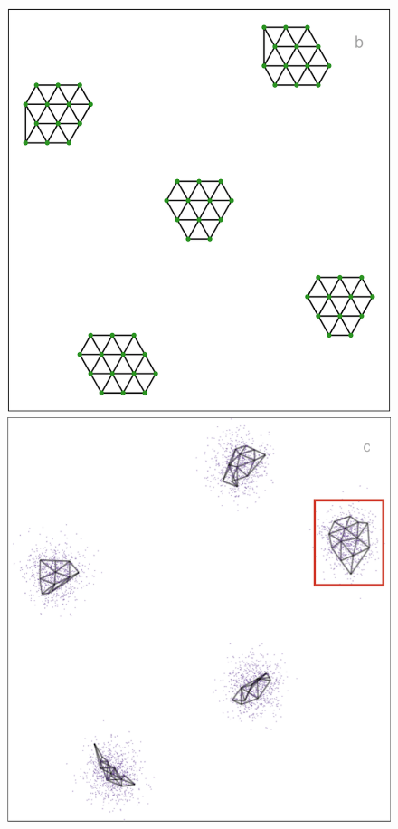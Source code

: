 \documentclass[
  12pt]{article}
\begin{document}
\begin{figure}[H]
\begin{minipage}{0.33\linewidth}
\includegraphics{figures/five_gau_clusters/2d_model_pacmap.png}\end{minipage}%
%
\begin{minipage}{0.33\linewidth}
\includegraphics{figures/five_gau_clusters/sc_pacmap_2.png}\end{minipage}%


\end{figure}
\end{document}

